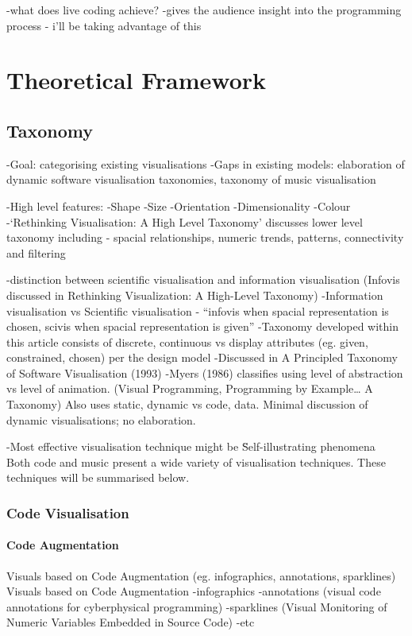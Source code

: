 -what does live coding achieve?
-gives the audience insight into the programming process - i’ll be taking advantage of this


\section{Theoretical Framework}
\label{sec:framework}




\subsection{Taxonomy}


-Goal: categorising existing visualisations
-Gaps in existing models: elaboration of dynamic software visualisation taxonomies, taxonomy of music visualisation

-High level features:
	-Shape
	-Size
	-Orientation
	-Dimensionality
	-Colour
-‘Rethinking Visualisation: A High Level Taxonomy' discusses lower level taxonomy including - spacial relationships, numeric trends, patterns, connectivity and filtering

-distinction between scientific visualisation and information visualisation (Infovis discussed in Rethinking Visualization: A High-Level Taxonomy)
-Information visualisation vs Scientific visualisation - “infovis when spacial representation is chosen, scivis when spacial representation is given”
-Taxonomy developed within this article consists of {discrete, continuous} vs display attributes (eg. given, constrained, chosen) per the design model
-Discussed in A Principled Taxonomy of Software Visualisation (1993)
-Myers (1986) classifies using level of abstraction vs level of animation. (Visual Programming, Programming by Example… A Taxonomy) Also uses {static, dynamic} vs {code, data}. Minimal discussion of dynamic visualisations; no elaboration.

-Most effective visualisation technique might be \"Self-illustrating phenomena\" \\

Both code and music present a wide variety of visualisation techniques. These techniques will be summarised below.


\subsubsection{Code Visualisation}
\paragraph{Code Augmentation}
Visuals based on Code Augmentation (eg. infographics, annotations, sparklines)\\
Visuals based on Code Augmentation
-infographics
-annotations (visual code annotations for cyberphysical programming)
-sparklines (Visual Monitoring of Numeric Variables Embedded in Source Code)
-etc

